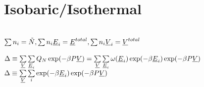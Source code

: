 \section{Isobaric/Isothermal}
\begin{mdframed}
    \vspace*{\baselineskip}
    \\

     $\sum\nolimits n_{i} = \tilde{\nummoles}, \sum\nolimits n_{i}\uline{\energy}_{i} = \uline{\energy}^{total},\sum\nolimits n_{i}\uline{\vol}_{i} = \uline{\vol}^{total}  $\\     %
    
     \\
    $\iipf \equiv \sum\limits_{\uline{\vol}}\sum\limits_{\uline{\energy}_{i}} \cpf\exp(-\boltznorm\p\uline{\vol}) = \sum\limits_{\uline{\vol}}\sum\limits_{\uline{\energy}_{i}} \mpf(\uline{\energy}_{i})\exp(-\boltznorm\uline{\energy}_{i})\exp(-\boltznorm\p\uline{\vol}) $\\
    
    $\iipf \equiv \sum\limits_{\uline{\vol}}\sum\limits_{i} \exp(-\boltznorm\uline{\energy}_{i})\exp(-\boltznorm\p\uline{\vol}) $ \\
           
     \\
    
\end{mdframed}